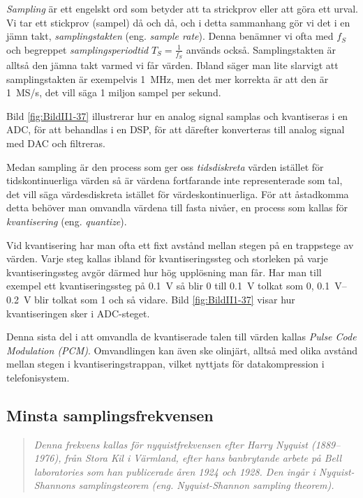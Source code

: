 \emph{Sampling} är ett engelskt ord som betyder att ta strickprov eller att göra ett urval.
Vi tar ett stickprov (sampel) då och då, och i detta sammanhang gör vi det i en jämn takt,
\emph{samplingstakten} (eng. \emph{sample rate}).
Denna benämner vi ofta med \(f_S\) och begreppet \emph{samplingsperiodtid}
\(T_S=\frac{1}{f_S}\) används också.
Samplingstakten är alltså den jämna takt varmed vi får värden.
Ibland säger man lite slarvigt att samplingstakten är exempelvis
\SI{1}{\mega\hertz}, men det mer korrekta är att den är 1~MS/s, det vill säga 1
miljon sampel per sekund.

Bild \ref{fig:BildII1-37} illustrerar hur en analog signal samplas och
kvantiseras i en ADC, för att behandlas i en DSP, för att därefter konverteras
till analog signal med DAC och filtreras.


Medan sampling är den process som ger oss \emph{tidsdiskreta} värden istället
för tidskontinuerliga värden så är värdena fortfarande inte representerade som
tal, det vill säga värdesdiskreta istället för värdeskontinuerliga.
För att åstadkomma detta behöver man omvandla värdena till fasta nivåer, en
process som kallas för \emph{kvantisering} (eng. \emph{quantize}).

Vid kvantisering har man ofta ett fixt avstånd mellan stegen på en
trappstege av värden. Varje steg kallas ibland för kvantiseringssteg och
storleken på varje kvantiseringssteg avgör därmed hur hög upplösning man får.
Har man till exempel ett kvantiseringssteg på \SI{0,1}{\volt} så blir 0 till
\SI{0,1}{\volt} tolkat som 0, \SIrange{0,1}{0,2}{\volt} blir tolkat som 1 och så
vidare.
Bild \ref{fig:BildII1-37} visar hur kvantiseringen sker i ADC-steget.

Denna sista del i att omvandla de kvantiserade talen till värden kallas
\emph{Pulse Code Modulation (PCM)}.
Omvandlingen kan även ske olinjärt, alltså med olika avstånd mellan stegen i
kvantiseringstrappan, vilket nyttjats för datakompression i telefonisystem.

\subsection{Minsta samplingsfrekvensen}

\begin{quote}
\emph{Denna frekvens kallas för nyquistfrekvensen efter Harry Nyquist (1889--1976),
från Stora Kil i Värmland, efter hans banbrytande arbete på Bell laboratories
som han publicerade åren 1924 och 1928. Den ingår i \emph{Nyquist-Shannons
samplingsteorem} (eng. \emph{Nyquist-Shannon sampling theorem}).}
\end{quote}

